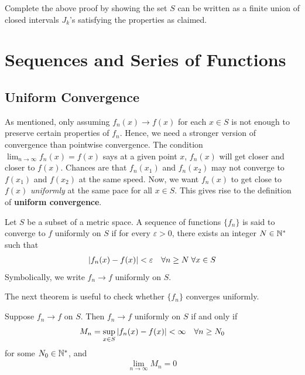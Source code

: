 \documentclass[thmcnt=section, 12pt]{my-elegantbook}
\begin{document}
\begin{exercise} \label{ex:12}
	Complete the above proof by showing the set $S$
	can be written as a finite union of closed intervals $J_k$'s
	satisfying the properties as claimed.
\end{exercise}



\chapter{Sequences and Series of Functions}


\section{Uniform Convergence}

As mentioned, only assuming $f_n(x) \to f(x)$ for each $x \in S$ is not enough to preserve certain properties of $f_n$. Hence, we need a stronger version of convergence than pointwise convergence. The condition $\lim_{n \to \infty} f_n(x) = f(x)$ says at a given point $x$, $f_n(x)$ will get closer and closer to $f(x)$. Chances are that $f_n(x_1)$ and $f_n(x_2)$ may not converge to $f(x_1)$ and $f(x_2)$ at the same speed. Now, we want $f_n(x)$ to get close to $f(x)$ \textit{uniformly} at the same pace for all $x \in S$. This gives rise to the definition of \textbf{uniform convergence}.

\begin{definition}
    Let $S$ be a subset of a metric space. A sequence of functions $\{f_n\}$ is said to converge to $f$ uniformly on $S$ if for every $\varepsilon > 0$, there exists an integer $N \in \mathbb{N}^\ast$ such that 
    \begin{align*}
        \left\lvert f_n(x) - f(x) \right\rvert < \varepsilon
        \quad \forall n \geq N \;
        \forall x \in S
    \end{align*}
    Symbolically, we write $f_n \to f$ uniformly on $S$.
\end{definition}


The next theorem is useful to check whether $\{f_n\}$ converges uniformly.

\begin{theorem} \label{thm:46}
    Suppose $f_n \to f$ on $S$. Then $f_n \to f$ uniformly on $S$ if and only if
    \begin{align*}
        M_n = \sup_{x \in S} \left\lvert f_n(x) - f(x) \right\rvert < \infty
        \quad \forall n \geq N_0
    \end{align*}
    for some $N_0 \in \mathbb{N}^\ast$, and 
    \begin{align*}
        \lim_{n \to \infty} M_n = 0
    \end{align*}
\end{theorem}
\end{document}
